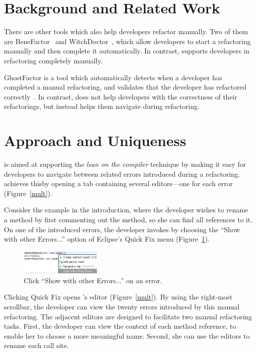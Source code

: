 \documentclass{sigplanconf}
\begin{document}
\section{Background and Related Work}
There are other tools which also help developers refactor manually. Two of them
are
BeneFactor~\cite{bene-factor} and WitchDoctor~\cite{witch-doctor},
which allow developers to start a refactoring manually and then
complete it automatically.
In contrast, \pname{} supports developers in refactoring completely manually.

GhostFactor is a tool which automatically detects
when a developer has completed a manual refactoring, and validates
that the developer has refactored correctly~\cite{ghost-factor}.
In contrast, \pname{} does not help developers with the correctness of
their refactorings, but instead helps them navigate during refactoring.

\section{Approach and Uniqueness}
\pname{} is aimed at supporting the \textit{lean on the compiler} technique
by making it easy for developers to navigate between related errors introduced
during a refactoring. \pname{} achieves thisby opening a tab containing
several editors---one for each error (Figure~\ref{mult}).

Consider the example in the introduction, where the developer
wishes to rename a method by first commenting out
the method, so she can find all references to it.
On one of the introduced errors, the developer invokes \pname{} by choosing
the ``Show with other Errors...'' option of Eclipse's Quick Fix
menu (Figure~\ref{quick}).

\begin{figure}[h]
\begin{center}
\includegraphics[width=0.35\textwidth]{quick-fix.png}
\caption{Click ``Show with other Errors...'' on an error.\label{quick}}
\end{center}
\end{figure}

Clicking Quick Fix opens \pname{}'s editor (Figure~\ref{mult}). By using the
right-most scrollbar, the developer
can view the twenty errors introduced by this manual refactoring.
The adjacent editors are designed to facilitate two manual refactoring tasks.
First, the developer can view the context of each method reference, to enable
her to choose a more meaningful name. Second, she can use the editors to rename
each call site.
\end{document}
